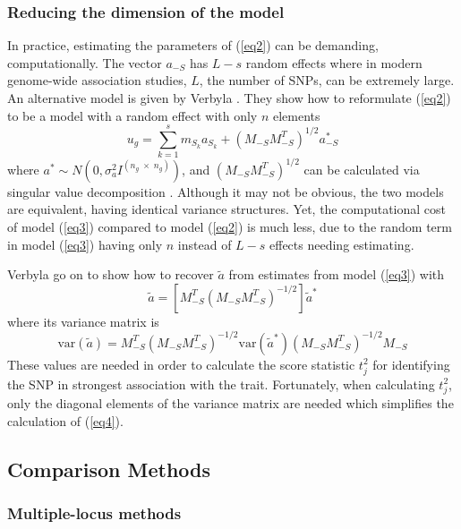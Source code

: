 \documentclass{article}
\begin{document}
\subsubsection{Reducing the dimension of the model}
In practice, estimating the parameters of (\ref{eq2}) can be demanding, computationally. 
The vector $a_{-S}$ has $L-s$ random effects where in modern genome-wide association studies, 
$L$, the number of SNPs, can be extremely large.  An alternative model is given by 
Verbyla \cite{verbyla2012rwgaim,verbyla2014whole}. 
They show how to reformulate (\ref{eq2}) to be a model with a random effect with only $n$ elements
\begin{equation}
\label{eq3}
u_g = \sum_{k=1}^s  m_{S_k} a_{S_k} + (M_{-S} M_{-S}^T)^{1/2} a^*_{-S}
\end{equation}
where $a^* \sim N(0, \sigma_a^2 I^{(n_g \; \times \;  n_g)})$, and 
$(M_{-S} M_{-S}^T)^{1/2}$ can be calculated via singular value decomposition \cite{golub2012matrix}.  
Although it may not be obvious, the two models are equivalent, 
having identical variance structures. Yet, the computational cost of model (\ref{eq3}) compared to 
model (\ref{eq2}) is much less, due to the random term in model (\ref{eq3}) having only $n$ instead of $L-s$ 
effects needing estimating. 

Verbyla \cite{verbyla2012rwgaim,verbyla2014whole} go on to show how to recover $\widetilde{a}$ from estimates from model  (\ref{eq3})  with 
\begin{equation}
\widetilde{a} = \left [ M_{-S}^T (M_{-S} M_{-S}^T)^{-1/2} \right ] \widetilde{a}^*
\end{equation}
where its variance matrix is
\begin{equation}
\label{eq4}
\textrm{var}(\widetilde{a}) = M_{-S}^T (M_{-S} M_{-S}^T)^{-1/2} \textrm{var}(\widetilde{a}^*) (M_{-S} M_{-S}^T)^{-1/2} M_{-S}
\end{equation}
These values are needed in order to calculate the score statistic $t_j^2$ for identifying the SNP in strongest association with the trait. 
Fortunately, when calculating $t_j^2$, only the diagonal elements of the variance matrix are needed which simplifies the  calculation 
of (\ref{eq4}). 


\subsection{Comparison Methods}

\subsubsection{Multiple-locus methods}
\end{document}
